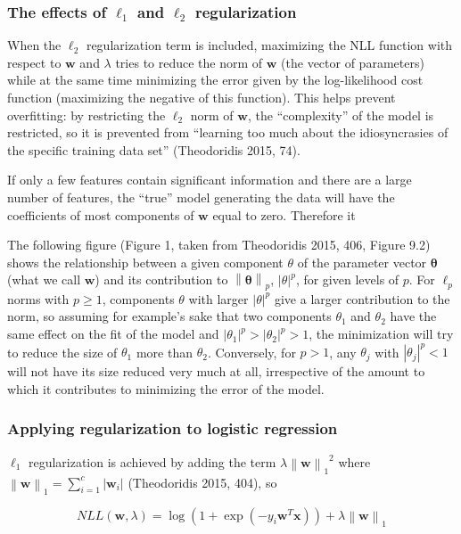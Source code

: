 \documentclass[letterpaper, 11pt]{article}
\newcommand{\norm}[1]{\left\lVert #1 \right\rVert}
\newcommand{\vect}[1]{\boldsymbol{#1}}
\begin{document}
\subsubsection{The effects of $\ell_1$ and $\ell_2$ regularization}

When the $\ell_2$ regularization term is included, maximizing the NLL function with respect to $\vect{w}$ and $\lambda$ tries to reduce the norm of $\vect{w}$ (the vector of parameters) while at the same time minimizing the error given by the log-likelihood cost function (maximizing the negative of this function). This helps prevent overfitting: by restricting the $\ell_2$ norm of $\vect{w}$, the ``complexity'' of the model is restricted, so it is prevented from ``learning too much about the idiosyncrasies of the specific training data set'' (Theodoridis 2015, 74).

If only a few features contain significant information and there are a large number of features, the ``true'' model generating the data will have the coefficients of most components of $\vect{w}$ equal to zero. Therefore it 

The following figure (Figure 1, taken from Theodoridis 2015, 406, Figure 9.2) shows the relationship between a given component $\theta$ of the parameter vector $\vect{\theta}$ (what we call $\vect{w}$) and its contribution to $\norm{\vect{\theta}}_p$, $|\theta|^p$, for given levels of $p$. For $\ell_p$ norms with $p \geq 1$, components $\theta$ with larger $|\theta|^p$ give a larger contribution to the norm, so assuming for example's sake that two components $\theta_1$ and $\theta_2$ have the same effect on the fit of the model and $|\theta_1|^p > |\theta_2|^p > 1$, the minimization will try to reduce the size of $\theta_1$ more than $\theta_2$. Conversely, for $p > 1$, any $\theta_j$ with $|\theta_j|^p < 1$ will not have its size reduced very much at all, irrespective of the amount to which it contributes to minimizing the error of the model.

\subsubsection{Applying regularization to logistic regression}

$\ell_1$ regularization is achieved by adding the term $\lambda {\norm{\vect{w}}_1}^2$ where $\norm{\vect{w}}_1 = \sum_{i=1}^{c} |\vect{w}_i|$ (Theodoridis 2015, 404), so

\begin{equation*}
  NLL(\vect{w}, \lambda) = \log(1 + \exp(-y_i \vect{w}^T\vect{x})) + \lambda {\norm{\vect{w}}_1}
\end{equation*}
\end{document}
